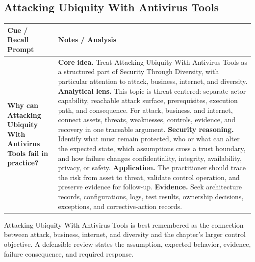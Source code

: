 \documentclass[11pt]{article}
\newcommand{\CornellHeader}{%
\rowcolor{Navy}\color{white}\bfseries Cue / Recall Prompt & \color{white}\bfseries Notes / Analysis\\\hline}
\newcommand{\CornellRow}[2]{%
\cellcolor{CueGray}\RaggedRight\textbf{#1} & \RaggedRight #2\\\hline}
\begin{document}
\subsection*{Attacking Ubiquity With Antivirus Tools}
\begin{longtable}{>{\RaggedRight\arraybackslash}p{}|>{\RaggedRight\arraybackslash}p{}}
\CornellHeader
\CornellRow{Why can Attacking Ubiquity With Antivirus Tools fail in practice?}{\textbf{Core idea.} Treat Attacking Ubiquity With Antivirus Tools as a structured part of Security Through Diversity, with particular attention to attack, business, internet, and diversity. \textbf{Analytical lens.} This topic is threat-centered: separate actor capability, reachable attack surface, prerequisites, execution path, and consequence. For attack, business, and internet, connect assets, threats, weaknesses, controls, evidence, and recovery in one traceable argument. \textbf{Security reasoning.} Identify what must remain protected, who or what can alter the expected state, which assumptions cross a trust boundary, and how failure changes confidentiality, integrity, availability, privacy, or safety. \textbf{Application.} The practitioner should trace the risk from asset to threat, validate control operation, and preserve evidence for follow-up. \textbf{Evidence.} Seek architecture records, configurations, logs, test results, ownership decisions, exceptions, and corrective-action records.}
\end{longtable}
\begin{topicsummary}
Attacking Ubiquity With Antivirus Tools is best remembered as the connection between attack, business, internet, and diversity and the chapter's larger control objective. A defensible review states the assumption, expected behavior, evidence, failure consequence, and required response.
\end{topicsummary}
\end{document}
